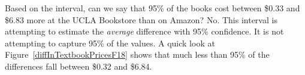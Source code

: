 
\begin{examplewrap}
\begin{nexample}
{Based on the interval, can we say that 95\% of the books cost between \$0.33 and \$6.83 more at the UCLA Bookstore than on Amazon? }No.  This interval is attempting to estimate the \emph{average} difference with 95\% confidence.  It is not attempting to capture 95\% of the values.  A quick look at Figure~\ref{diffInTextbookPricesF18} shows that much less than 95\% of the differences fall between \$0.32 and \$6.84.


\end{nexample}
\end{examplewrap}


